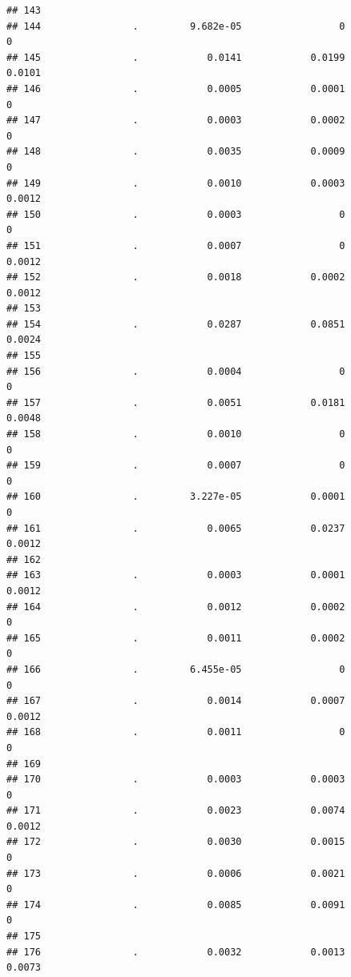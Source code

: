 \documentclass[
]{article}
\begin{document}
\begin{verbatim}
## 143                                                                       
## 144                .         9.682e-05                 0                 0
## 145                .            0.0141            0.0199            0.0101
## 146                .            0.0005            0.0001                 0
## 147                .            0.0003            0.0002                 0
## 148                .            0.0035            0.0009                 0
## 149                .            0.0010            0.0003            0.0012
## 150                .            0.0003                 0                 0
## 151                .            0.0007                 0            0.0012
## 152                .            0.0018            0.0002            0.0012
## 153                                                                       
## 154                .            0.0287            0.0851            0.0024
## 155                                                                       
## 156                .            0.0004                 0                 0
## 157                .            0.0051            0.0181            0.0048
## 158                .            0.0010                 0                 0
## 159                .            0.0007                 0                 0
## 160                .         3.227e-05            0.0001                 0
## 161                .            0.0065            0.0237            0.0012
## 162                                                                       
## 163                .            0.0003            0.0001            0.0012
## 164                .            0.0012            0.0002                 0
## 165                .            0.0011            0.0002                 0
## 166                .         6.455e-05                 0                 0
## 167                .            0.0014            0.0007            0.0012
## 168                .            0.0011                 0                 0
## 169                                                                       
## 170                .            0.0003            0.0003                 0
## 171                .            0.0023            0.0074            0.0012
## 172                .            0.0030            0.0015                 0
## 173                .            0.0006            0.0021                 0
## 174                .            0.0085            0.0091                 0
## 175                                                                       
## 176                .            0.0032            0.0013            0.0073

\end{verbatim}
\end{document}
